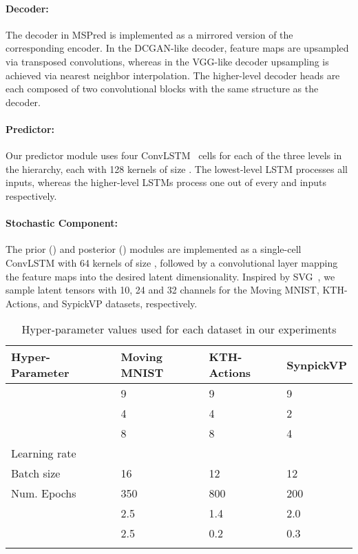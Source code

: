 \documentclass{bmvc2k}
\begin{document}
\paragraph{Decoder:} The decoder in MSPred is implemented as a mirrored version of the corresponding encoder. In the DCGAN-like decoder, feature maps are upsampled via transposed convolutions, whereas in the VGG-like decoder upsampling is achieved via nearest neighbor interpolation.
The higher-level decoder heads are each composed of two convolutional blocks with the same structure as the decoder.


\paragraph{Predictor:} Our predictor module uses four ConvLSTM~\cite{Shi_ConvLSTMNetworkPrecipitationNowcasting_2015} cells for each of the three levels in the hierarchy, each with
128 kernels of size . The lowest-level LSTM processes all inputs, whereas the higher-level LSTMs process one out of every  and  inputs respectively.


\paragraph{Stochastic Component:} The prior () and posterior () modules are implemented as a single-cell ConvLSTM  with 64 kernels of size , followed by a convolutional layer mapping the feature maps into the desired latent dimensionality. Inspired by SVG~\cite{Villegas_HighFidelityVideoPrediction_2019}, we sample latent tensors with 10, 24 and 32 channels for the Moving MNIST, KTH-Actions, and SypickVP datasets, respectively.





\begin{table}[t!]
	\caption{Hyper-parameter values used for each dataset in our experiments}
	\label{table: hyper params}
	\centering
	\small
	\vspace{0.05cm}
	\begin{tabular}{P{2.4cm} P{0.01cm} P{2.2cm}P{2.0cm}P{1.6cm}}
		\toprule
\textbf{Hyper-Parameter} &&  \textbf{Moving MNIST} & \textbf{KTH-Actions} & \textbf{SynpickVP} \\
\midrule
 && 9 & 9 & 9 \\
		 && 4 & 4 & 2 \\
		 && 8 & 8 & 4 \\
		Learning rate &&  &  &  \\
		Batch size && 16 & 12 & 12 \\
		Num. Epochs && 350 & 800 & 200 \\
		 && 2.5 & 1.4 & 2.0 \\
		 && 2.5 & 0.2 & 0.3 \\
		 &&  &  &  \\	
\bottomrule
	\end{tabular}
\end{table}
\end{document}
